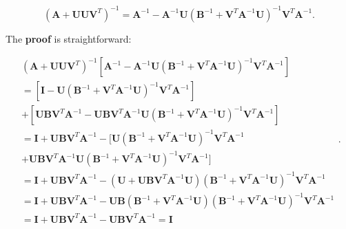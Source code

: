 \documentclass[10pt,b5paper,titlepage]{book}
\begin{document}
\begin{equation}
    (\mathbf{A} + \mathbf{U}\mathbf{U}\mathbf{V}^{T})^{-1}
    = \mathbf{A}^{-1} - \mathbf{A}^{-1}\mathbf{U}
    (\mathbf{B}^{-1} + \mathbf{V}^{T}\mathbf{A}^{-1}\mathbf{U})^{-1}
    \mathbf{V}^{T}\mathbf{A}^{-1}
.\end{equation}

The \textbf{proof} is straightforward:

\begin{equation}
    \begin{array}{l}
        (\mathbf{A} + \mathbf{U}\mathbf{U}\mathbf{V}^{T})^{-1}
        [\mathbf{A}^{-1} - \mathbf{A}^{-1}\mathbf{U}
        (\mathbf{B}^{-1} + \mathbf{V}^{T}\mathbf{A}^{-1}\mathbf{U})^{-1}
        \mathbf{V}^{T}\mathbf{A}^{-1}] \\
        = [\mathbf{I}
        - \mathbf{U}(\mathbf{B}^{-1}
        + \mathbf{V}^{T}\mathbf{A}^{-1}\mathbf{U})^{-1}\mathbf{V}^{T}\mathbf{A}^{-1}]\\
        + [\mathbf{U}\mathbf{B}\mathbf{V}^{T}\mathbf{A}^{-1}
        - \mathbf{U}\mathbf{B}\mathbf{V}^{T}\mathbf{A}^{-1}\mathbf{U}
        (\mathbf{B}^{-1} + \mathbf{V}^{T}\mathbf{A}^{-1}\mathbf{U})^{-1}
        \mathbf{V}^{T}\mathbf{A}^{-1}]\\
        = \mathbf{I} + \mathbf{U}\mathbf{B}\mathbf{V}^{T}\mathbf{A}^{-1}
        - [\mathbf{U}(\mathbf{B}^{-1} + \mathbf{V}^{T}\mathbf{A}^{-1}\mathbf{U})^{-1}
        \mathbf{V}^{T}\mathbf{A}^{-1}\\
        + \mathbf{U}\mathbf{B}\mathbf{V}^{T}\mathbf{A}^{-1}\mathbf{U}
        (\mathbf{B}^{-1} + \mathbf{V}^{T}\mathbf{A}^{-1}\mathbf{U})^{-1}
        \mathbf{V}^{T}\mathbf{A}^{-1}]\\
        = \mathbf{I} + \mathbf{U}\mathbf{B}\mathbf{V}^{T}\mathbf{A}^{-1}
        - (\mathbf{U} + \mathbf{U}\mathbf{B}\mathbf{V}^{T}\mathbf{A}^{-1}\mathbf{U})
        (\mathbf{B}^{-1} + \mathbf{V}^{T}\mathbf{A}^{-1}\mathbf{U})^{-1}
        \mathbf{V}^{T}\mathbf{A}^{-1}\\
        = \mathbf{I} + \mathbf{U}\mathbf{B}\mathbf{V}^{T}\mathbf{A}^{-1}
        - \mathbf{U}\mathbf{B}(\mathbf{B}^{-1} + \mathbf{V}^{T}\mathbf{A}^{-1}\mathbf{U})
        (\mathbf{B}^{-1} + \mathbf{V}^{T}\mathbf{A}^{-1}\mathbf{U})^{-1}
        \mathbf{V}^{T}\mathbf{A}^{-1}\\
        = \mathbf{I} + \mathbf{U}\mathbf{B}\mathbf{V}^{T}\mathbf{A}^{-1}
        - \mathbf{U}\mathbf{B}\mathbf{V}^{T}\mathbf{A}^{-1} = \mathbf{I}
    \end{array}
.\end{equation}
\end{document}
